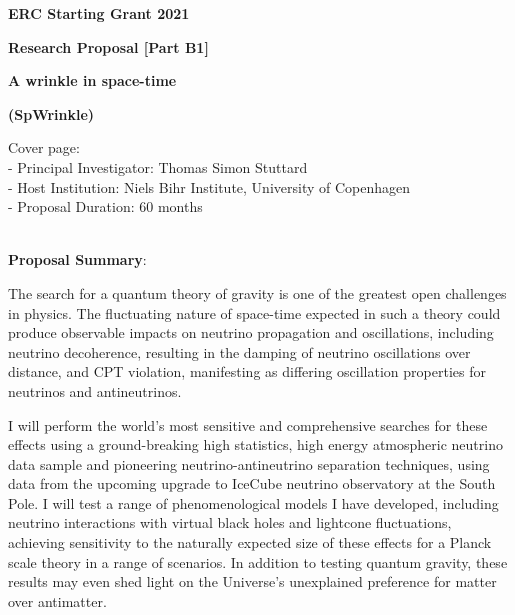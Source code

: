 \documentclass[a4paper,11pt]{article}
\renewcommand{\smallskip} {\vspace{0.1in}}
\begin{document}
\renewcommand{\headrulewidth}{0pt}



\vspace{1cm}

\centerline{ \large \textbf{ERC Starting Grant 2021}} \smallskip
\centerline{ \large \textbf {Research Proposal [Part B1]}} \smallskip

\vspace{1.0cm}

%
\centerline{\huge \textbf{A wrinkle in space-time}}
\vspace{0.5cm}
\centerline{ \huge {\bf (SpWrinkle)}} 



\vspace{1.5cm}

\noindent
Cover page: \\
- Principal Investigator: Thomas Simon Stuttard\\
- Host Institution: Niels Bihr Institute, University of Copenhagen\\
- Proposal Duration: $60$ months\\

~\vspace{0. cm}

\noindent
{\bf Proposal Summary}:

The search for a quantum theory of gravity is one of the greatest open challenges in physics. The fluctuating nature of space-time expected in such a theory could produce observable impacts on neutrino propagation and oscillations, including neutrino decoherence, resulting in the damping of neutrino oscillations over distance, and CPT violation, manifesting as differing oscillation properties for neutrinos and antineutrinos.

I will perform the world’s most sensitive and comprehensive searches for these effects using a ground-breaking high statistics, high energy atmospheric neutrino data sample and pioneering neutrino-antineutrino separation techniques, using data from the upcoming upgrade to IceCube neutrino observatory at the South Pole. I will test a range of phenomenological models I have developed, including neutrino interactions with virtual black holes and lightcone fluctuations, achieving sensitivity to the naturally expected size of these effects for a Planck scale theory in a range of scenarios. In addition to testing quantum gravity, these results may even shed light on the Universe’s unexplained preference for matter over antimatter.
\end{document}
